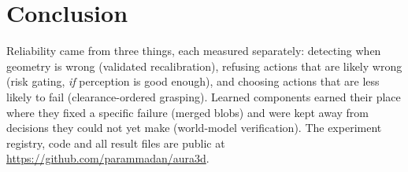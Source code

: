 \documentclass[10pt,twocolumn]{article}
\begin{document}
\section{Conclusion}
Reliability came from three things, each measured separately: detecting when geometry is wrong (validated
recalibration), refusing actions that are likely wrong (risk gating, \emph{if} perception is good enough), and choosing
actions that are less likely to fail (clearance-ordered grasping). Learned components earned their place where they
fixed a specific failure (merged blobs) and were kept away from decisions they could not yet make (world-model
verification). The experiment registry, code and all result files are public at
\url{https://github.com/parammadan/aura3d}.



\end{document}
